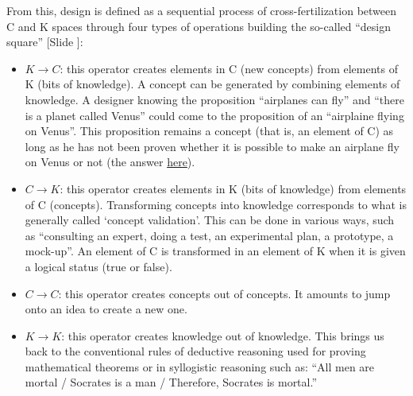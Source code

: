 \documentclass{article}
\newcounter{slide}
\begin{document}
From this, design is defined as a sequential process of cross-fertilization between C and K spaces through four types of operations building the so-called ``design square'' {\color{blue}[Slide ]}:
\begin{itemize}
	\item $K\rightarrow C$: this operator creates elements in C (new concepts) from elements of K (bits of knowledge). A concept can be generated by combining elements of knowledge. A designer knowing the proposition ``airplanes can fly'' and ``there is a planet called Venus'' could come to the proposition of an ``airplaine flying on Venus''. This proposition remains a concept (that is, an element of C) as long as he has not been proven whether it is possible to make an airplane fly on Venus or not (the answer \href{https://whatif.xkcd.com/book/}{here}).
	\item $C\rightarrow K$: this operator creates elements in K (bits of knowledge) from elements of C (concepts). Transforming concepts into knowledge corresponds to what is generally called `concept validation'. This can be done in various ways, such as ``consulting an expert, doing a test, an experimental plan, a prototype, a mock-up''. An element of C is transformed in an element of K when it is given a logical status (true or false).
	\item $C\rightarrow C$: this operator creates concepts out of concepts. It amounts to jump onto an idea to create a new one.
	\item $K\rightarrow K$: this operator creates knowledge out of knowledge. This brings us back to the conventional rules of deductive reasoning used for proving mathematical theorems or in syllogistic reasoning such as: ``All men are mortal / Socrates is a man / Therefore, Socrates is mortal.'' 
\end{itemize}
\end{document}
